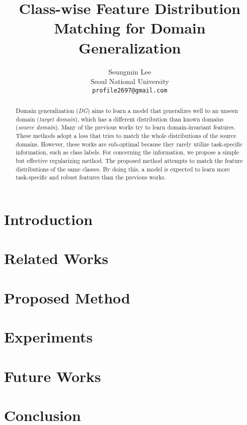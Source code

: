 \documentclass[10pt,twocolumn,letterpaper]{article}
\begin{document}
\title{Class-wise Feature Distribution Matching for Domain Generalization}

\author{Seungmin Lee\\
Seoul National University\\
{\tt\small profile2697@gmail.com}
}

\maketitle

\begin{abstract}
 Domain generalization (\textit{DG}) aims to learn a model that generalizes well to an unseen domain (\textit{target domain}), which has a different distribution than known domains (\textit{source domain}). Many of the previous works try to learn domain-invariant features. These methods adopt a loss that tries to match the whole distributions of the source domains. However, these works are sub-optimal because they rarely utilize task-specific information, such as class labels. For concerning the information, we propose a simple but effective regularizing method. The proposed method attempts to match the feature distributions of the same classes. By doing this, a model is expected to learn more task-specific and robust features than the previous works.
\end{abstract}

\section{Introduction}


\section{Related Works}


\section{Proposed Method}


\section{Experiments}


\section{Future Works}


\section{Conclusion}



{\small


}
\end{document}
